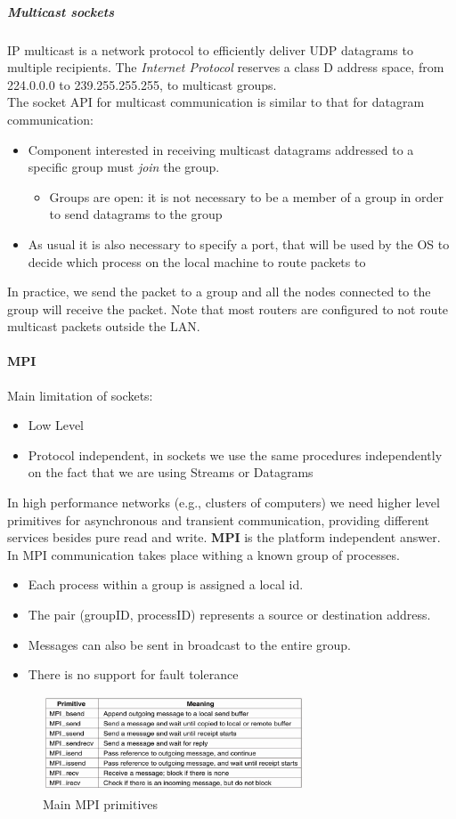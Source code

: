 \documentclass[10pt,a4paper]{article}
\begin{document}
\subparagraph{Multicast sockets}
IP multicast is a network protocol to efficiently deliver UDP datagrams to multiple recipients. The \textit{Internet Protocol} reserves a class D address space, from 224.0.0.0 to 239.255.255.255, to multicast groups. \\
The socket API for multicast communication is similar to that for datagram communication: 
\begin{itemize}
	\item Component interested in receiving multicast datagrams addressed to a specific group must \textit{join} the group.
	\begin{itemize}
		\item Groups are open: it is not necessary to be a member of a group in order to send datagrams to the group
	\end{itemize}
	\item As usual it is also necessary to specify a port, that will be used by the OS to decide which process on the local machine to route packets to
\end{itemize}
In practice, we send the packet to a group and all the nodes connected to the group will receive the packet. Note that most routers are configured to not route multicast packets outside the LAN.
\paragraph{MPI}
Main limitation of sockets:
\begin{itemize}
	\item Low Level
	\item Protocol independent, in sockets we use the same procedures independently on the fact that we are using Streams or Datagrams
\end{itemize}
In high performance networks (e.g., clusters of computers) we need higher level primitives for asynchronous and transient communication, providing different services besides pure read and write. \textbf{MPI} is the platform independent answer. \\ 
In MPI communication takes place withing a known group of processes. 
\begin{itemize}
	\item Each process within a group is assigned a local id.
	\item The pair (groupID, processID) represents a source or destination address.
	\item Messages can also be sent in broadcast to the entire group.
	\item There is no support for fault tolerance
\end{itemize}  
 \begin{figure}[h!]
 \hfill \includegraphics[width=220pt]{images/mpi.png}\hspace*{\fill}
 \caption{Main MPI primitives}
  \label{fig:mpi}
\end{figure}
\end{document}
